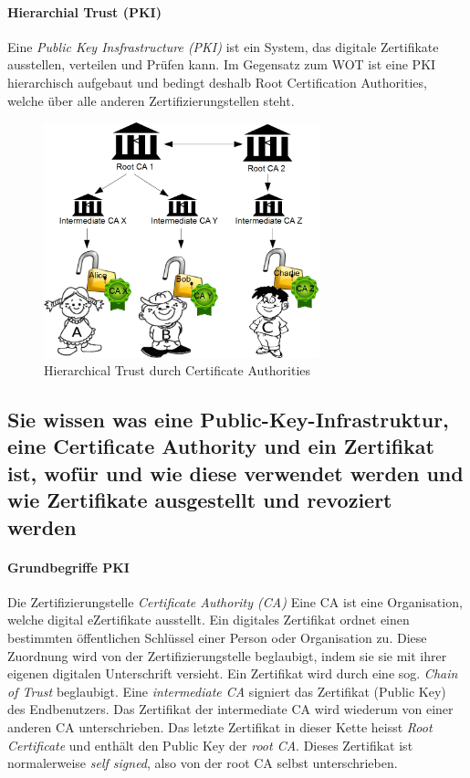 \documentclass[10pt,a4paper]{article}
\begin{document}
\paragraph*{Hierarchial Trust (PKI)}Eine \textsl{Public Key Insfrastructure (PKI)} ist ein System, das digitale Zertifikate ausstellen, verteilen und Prüfen kann. Im Gegensatz zum WOT ist eine PKI hierarchisch aufgebaut und bedingt deshalb Root Certification Authorities, welche über alle anderen Zertifizierungstellen steht.
\begin{figure}[H]
    \begin{center}
    \includegraphics[width=8cm]{images/ht.png}
    \caption{Hierarchical Trust durch Certificate Authorities}
    \label{ht}
    \end{center}
\end{figure}


\subsection*{Sie wissen was eine Public-Key-Infrastruktur, eine Certificate Authority und ein Zertifikat ist, wofür und wie diese verwendet werden und wie Zertifikate ausgestellt und revoziert werden}

\paragraph*{Grundbegriffe PKI}Die Zertifizierungstelle \textsl{Certificate Authority (CA)}\newline
Eine CA ist eine Organisation, welche digital eZertifikate ausstellt. Ein digitales Zertifikat ordnet einen bestimmten öffentlichen Schlüssel einer Person oder Organisation zu. Diese Zuordnung wird von der Zertifizierungstelle beglaubigt, indem sie sie mit ihrer eigenen digitalen Unterschrift versieht.\newline
Ein Zertifikat wird durch eine sog. \textsl{Chain of Trust} beglaubigt. Eine \textsl{intermediate CA} signiert das Zertifikat (Public Key) des Endbenutzers. Das Zertifikat der intermediate CA wird wiederum von einer anderen CA unterschrieben. Das letzte Zertifikat in dieser Kette heisst \textsl{Root Certificate} und enthält den Public Key der \textsl{root CA}. Dieses Zertifikat ist normalerweise \textsl{self signed}, also von der root CA selbst unterschrieben.
\end{document}
